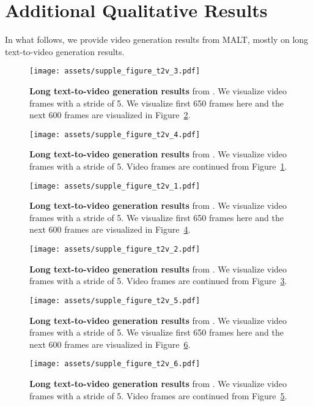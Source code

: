 \section{Additional Qualitative Results}
\label{appen:more_qual}
In what follows, we provide video generation results from MALT, mostly on long text-to-video generation results.
\begin{figure*}[ht!]
    \centering
    \texttt{[image: assets/supple\_figure\_t2v\_3.pdf]}
    \caption{\textbf{Long text-to-video generation results} from \sname. We visualize video frames with a stride of 5. We visualize first 650 frames here and the next 600 frames are visualized in Figure~\ref{fig:t2v_supp_4}.
    } 
    \label{fig:t2v_supp_3}
\end{figure*}
\begin{figure*}[ht!]
    \centering
    \texttt{[image: assets/supple\_figure\_t2v\_4.pdf]}
    \caption{\textbf{Long text-to-video generation results} from \sname. We visualize video frames with a stride of 5. Video frames are continued from Figure~\ref{fig:t2v_supp_3}.
    } 
    \label{fig:t2v_supp_4}
\end{figure*}
\begin{figure*}[ht!]
    \centering
    \texttt{[image: assets/supple\_figure\_t2v\_1.pdf]}
    \caption{\textbf{Long text-to-video generation results} from \sname. We visualize video frames with a stride of 5. We visualize first 650 frames here and the next 600 frames are visualized in Figure~\ref{fig:t2v_supp_2}.} 
    \label{fig:t2v_supp_1}
\end{figure*}
\begin{figure*}[ht!]
    \centering
    \texttt{[image: assets/supple\_figure\_t2v\_2.pdf]}
    \caption{\textbf{Long text-to-video generation results} from \sname. We visualize video frames with a stride of 5. Video frames are continued from Figure~\ref{fig:t2v_supp_1}.
    } 
    \label{fig:t2v_supp_2}
\end{figure*}
\begin{figure*}[ht!]
    \centering
    \texttt{[image: assets/supple\_figure\_t2v\_5.pdf]}
    \caption{\textbf{Long text-to-video generation results} from \sname. We visualize video frames with a stride of 5. We visualize first 650 frames here and the next 600 frames are visualized in Figure~\ref{fig:t2v_supp_6}.} 
    \label{fig:t2v_supp_5}
\end{figure*}
\begin{figure*}[ht!]
    \centering
    \texttt{[image: assets/supple\_figure\_t2v\_6.pdf]}
    \vspace{-3.2in}
    \caption{\textbf{Long text-to-video generation results} from \sname. We visualize video frames with a stride of 5. Video frames are continued from Figure~\ref{fig:t2v_supp_5}.
    } 
    \label{fig:t2v_supp_6}
\end{figure*}
